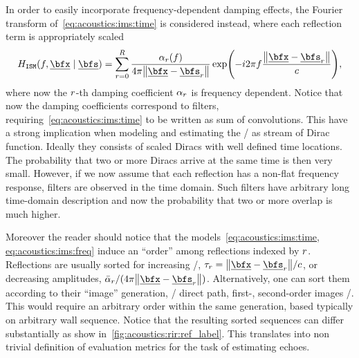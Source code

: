 \mynewline
In order to easily incorporate frequency-dependent damping effects, the Fourier transform of~\cref{eq:acoustics:ims:time} is considered instead, where
each reflection term is appropriately scaled
\begin{equation}
    \label{eq:acoustics:ims:freq}
    \rirFreq_{\mathtt{ISM}}(f, \positionMicrophone \mid \positionSource) =
        \sum_{\idxEch=0}^{\numEchs} \frac{\absCoeff_{\idxEch}(f)}{4 \pi \norm{\positionMicrophone - \positionSource_\idxEch}}
        \exp\kparen{- \csti 2 \pi f \frac{\norm{\positionMicrophone - \positionSource_\idxEch}}{\speedOfSound}}
        ,
\end{equation}
where now the $r$-th damping coefficient $\alpha_{r}$ is frequency dependent.
Notice that now the damping coefficients correspond to filters, requiring~\cref{eq:acoustics:ims:time} to be written as sum of convolutions.
This have a strong implication when modeling and estimating the \RIRs/ as stream of Dirac function.
Ideally they consists of scaled Diracs with well defined time locations.
The probability that two or more Diracs arrive at the same time is then very small.
However, if we now assume that each reflection has a non-flat frequency response, filters are observed in the time domain.
Such filters have arbitrary long time-domain description and now the probability that two or more overlap is much higher.



\mynewline
Moreover the reader should notice that the models~\eqref{eq:acoustics:ims:time, eq:acoustics:ims:freq} induce an ``order'' among reflections indexed by $r$.
Reflections are usually sorted for increasing \TOA/, $\tau_r = \norm{\positionMicrophone - \positionSource_\idxEch}/\speedOfSound$,
or decreasing amplitudes, $\bar{\absCoeff}_{\idxEch}/(4 \pi \norm{\positionMicrophone - \positionSource_\idxEch})$.
Alternatively, one can sort them according to their ``image'' generation, \eg/ direct path, first-, second-order images \etc/.
This would require an arbitrary order within the same generation, based typically on arbitrary wall sequence.
Notice that the resulting sorted sequences can differ substantially as show in~\cref{fig:acoustics:rir:ref_label}.
This translates into non trivial definition of evaluation metrics for the task of estimating echoes.

